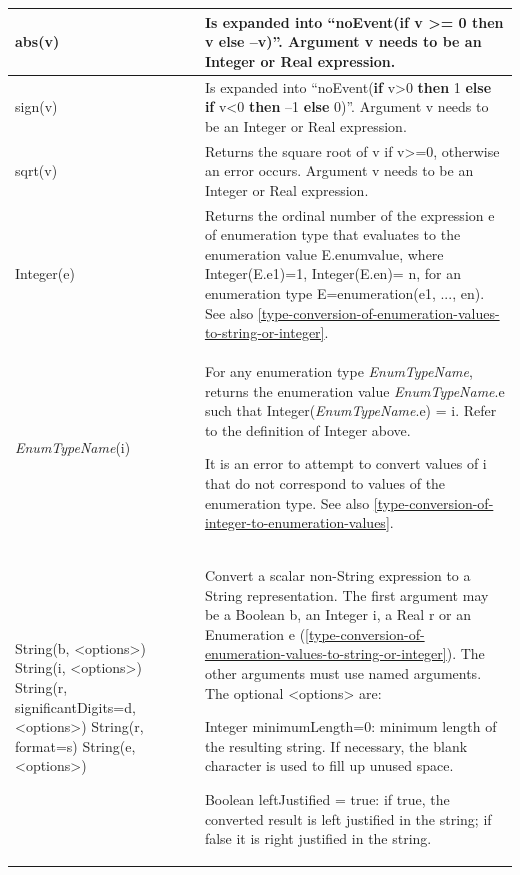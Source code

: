 \documentclass[10pt,a4paper]{report}
\begin{document}
\begin{longtable}{|p{5cm}|p{8cm}|}
\hline
abs(v) & Is expanded into ``noEvent(\textbf{if} v \textgreater{}= 0
\textbf{then} v \textbf{else} --v)''. Argument v needs to be an Integer
or Real expression.\\ \hline
sign(v) & Is expanded into ``noEvent(\textbf{if} v\textgreater{}0
\textbf{then} 1 \textbf{else if} v\textless{}0 \textbf{then} --1
\textbf{else} 0)''. Argument v needs to be an Integer or Real
expression.\\ \hline
sqrt(v) & Returns the square root of v if v\textgreater{}=0, otherwise
an error occurs. Argument v needs to be an Integer or Real
expression.\\ \hline
Integer(e) & Returns the ordinal number of the expression e of
enumeration type that evaluates to the enumeration value E.enumvalue,
where Integer(E.e1)=1, Integer(E.en)= n, for an enumeration type
E=enumeration(e1, ..., en). See also \ref{type-conversion-of-enumeration-values-to-string-or-integer}.\\ \hline
\emph{EnumTypeName}(i) & 
For any enumeration type \emph{EnumTypeName}, returns the enumeration
value \emph{EnumTypeName}.e such that Integer(\emph{EnumTypeName}.e) =
i. Refer to the definition of Integer above.

It is an error to attempt to convert values of i that do not correspond
to values of the enumeration type. See also \ref{type-conversion-of-integer-to-enumeration-values}.
\\ \hline
String(b, \textless{}options\textgreater{})\newline
String(i, \textless{}options\textgreater{})\newline
String(r,
significantDigits=d,\newline
\textless{}options\textgreater{})\newline
String(r, format=s)\newline
String(e, \textless{}options\textgreater{})
& Convert a scalar non-String expression to a String representation. The
first argument may be a Boolean b, an Integer i, a Real r or an
Enumeration e (\ref{type-conversion-of-enumeration-values-to-string-or-integer}). The other arguments must use named
arguments. The optional \textless{}options\textgreater{} are:

Integer minimumLength=0: minimum length of the resulting string. If
necessary, the blank character is used to fill up unused space.

Boolean leftJustified = true: if true, the converted result is left
justified in the string; if false it is right justified in the string.


\end{longtable}
\end{document}
